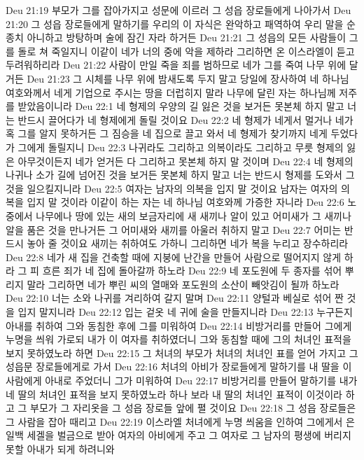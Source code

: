 Deu 21:19  부모가 그를 잡아가지고 성문에 이르러 그 성읍 장로들에게 나아가서
Deu 21:20  그 성읍 장로들에게 말하기를 우리의 이 자식은 완악하고 패역하여 우리 말을 순종치 아니하고 방탕하며 술에 잠긴 자라 하거든
Deu 21:21  그 성읍의 모든 사람들이 그를 돌로 쳐 죽일지니 이같이 네가 너의 중에 악을 제하라 그리하면 온 이스라엘이 듣고 두려워하리라
Deu 21:22  사람이 만일 죽을 죄를 범하므로 네가 그를 죽여 나무 위에 달거든
Deu 21:23  그 시체를 나무 위에 밤새도록 두지 말고 당일에 장사하여 네 하나님 여호와께서 네게 기업으로 주시는 땅을 더럽히지 말라 나무에 달린 자는 하나님께 저주를 받았음이니라
Deu 22:1  네 형제의 우양의 길 잃은 것을 보거든 못본체 하지 말고 너는 반드시 끌어다가 네 형제에게 돌릴 것이요
Deu 22:2  네 형제가 네게서 멀거나 네가 혹 그를 알지 못하거든 그 짐승을 네 집으로 끌고 와서 네 형제가 찾기까지 네게 두었다가 그에게 돌릴지니
Deu 22:3  나귀라도 그리하고 의복이라도 그리하고 무릇 형제의 잃은 아무것이든지 네가 얻거든 다 그리하고 못본체 하지 말 것이며
Deu 22:4  네 형제의 나귀나 소가 길에 넘어진 것을 보거든 못본체 하지 말고 너는 반드시 형제를 도와서 그것을 일으킬지니라
Deu 22:5  여자는 남자의 의복을 입지 말 것이요 남자는 여자의 의복을 입지 말 것이라 이같이 하는 자는 네 하나님 여호와께 가증한 자니라
Deu 22:6  노중에서 나무에나 땅에 있는 새의 보금자리에 새 새끼나 알이 있고 어미새가 그 새끼나 알을 품은 것을 만나거든 그 어미새와 새끼를 아울러 취하지 말고
Deu 22:7  어미는 반드시 놓아 줄 것이요 새끼는 취하여도 가하니 그리하면 네가 복을 누리고 장수하리라
Deu 22:8  네가 새 집을 건축할 때에 지붕에 난간을 만들어 사람으로 떨어지지 않게 하라 그 피 흐른 죄가 네 집에 돌아갈까 하노라
Deu 22:9  네 포도원에 두 종자를 섞어 뿌리지 말라 그리하면 네가 뿌린 씨의 열매와 포도원의 소산이 빼앗김이 될까 하노라
Deu 22:10  너는 소와 나귀를 겨리하여 갈지 말며
Deu 22:11  양털과 베실로 섞어 짠 것을 입지 말지니라
Deu 22:12  입는 겉옷 네 귀에 술을 만들지니라
Deu 22:13  누구든지 아내를 취하여 그와 동침한 후에 그를 미워하여
Deu 22:14  비방거리를 만들어 그에게 누명을 씌워 가로되 내가 이 여자를 취하였더니 그와 동침할 때에 그의 처녀인 표적을 보지 못하였노라 하면
Deu 22:15  그 처녀의 부모가 처녀의 처녀인 표를 얻어 가지고 그 성읍문 장로들에게로 가서
Deu 22:16  처녀의 아비가 장로들에게 말하기를 내 딸을 이 사람에게 아내로 주었더니 그가 미워하여
Deu 22:17  비방거리를 만들어 말하기를 내가 네 딸의 처녀인 표적을 보지 못하였노라 하나 보라 내 딸의 처녀인 표적이 이것이라 하고 그 부모가 그 자리옷을 그 성읍 장로들 앞에 펼 것이요
Deu 22:18  그 성읍 장로들은 그 사람을 잡아 때리고
Deu 22:19  이스라엘 처녀에게 누명 씌움을 인하여 그에게서 은 일백 세겔을 벌금으로 받아 여자의 아비에게 주고 그 여자로 그 남자의 평생에 버리지 못할 아내가 되게 하려니와
